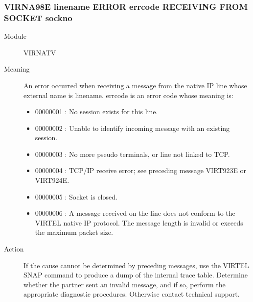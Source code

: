 \documentclass[letterpaper,10pt,english]{sphinxmanual}
\begin{document}
\subsubsection{VIRNA98E linename ERROR errcode RECEIVING FROM SOCKET sockno}
\label{\detokenize{messages:virna98e-linename-error-errcode-receiving-from-socket-sockno}}\begin{description}
\item[{Module}] \leavevmode
VIRNATV

\item[{Meaning}] \leavevmode
An error occurred when receiving a message from the native IP line whose external name is linename. errcode is an error code whose meaning is:
\begin{itemize}
\item {} 
00000001 : No session exists for this line.

\item {} 
00000002 : Unable to identify incoming message with an existing session.

\item {} 
00000003 : No more pseudo terminals, or line not linked to TCP.

\item {} 
00000004 : TCP/IP receive error; see preceding message VIRT923E or VIRT924E.

\item {} 
00000005 : Socket is closed.

\item {} 
00000006 : A message received on the line does not conform to the VIRTEL native IP protocol. The message length is invalid or exceeds the maximum packet size.

\end{itemize}

\item[{Action}] \leavevmode
If the cause cannot be determined by preceding messages, use the VIRTEL SNAP command to produce a dump of the internal trace table. Determine whether the partner sent an invalid message, and if so, perform the appropriate diagnostic procedures. Otherwise contact technical support.

\end{description}
\end{document}
